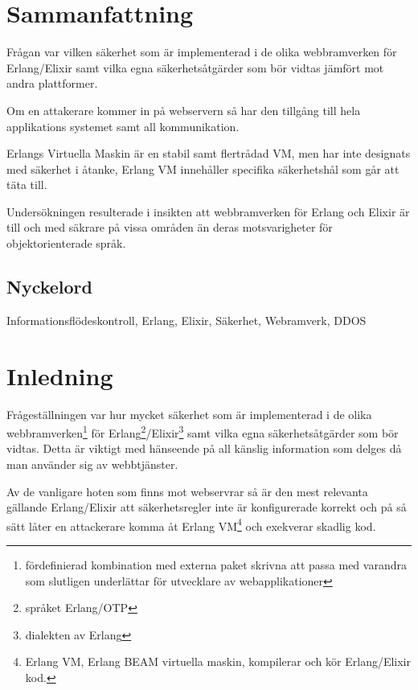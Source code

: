 \documentclass[12pt]{article}
\begin{document}
\maketitle

	 	 	 	 	
	
\section*{Sammanfattning}
Frågan var vilken säkerhet som är implementerad i de olika webbramverken för Erlang/Elixir samt vilka egna säkerhetsåtgärder som bör vidtas jämfört mot andra plattformer.

Om en attakerare kommer in på webservern så har den tillgång till hela applikations systemet samt all kommunikation.

Erlangs Virtuella Maskin är en stabil samt flertrådad VM, men har inte designats med säkerhet i åtanke, Erlang VM innehåller specifika säkerhetshål som går att täta till.

Undersökningen resulterade i insikten att webbramverken för Erlang och Elixir är till och med säkrare på vissa områden än deras motsvarigheter för objektorienterade språk.

\subsection*{Nyckelord}
Informationsflödeskontroll, Erlang, Elixir, Säkerhet, Webramverk, DDOS
	
\section{Inledning}

Frågeställningen var hur mycket säkerhet som är implementerad i de olika webbramverken\footnote{fördefinierad kombination med externa paket skrivna att passa med varandra som slutligen underlättar för utvecklare av webapplikationer} för Erlang\footnote{språket Erlang/OTP\cite{erlang}}/Elixir\footnote{dialekten av Erlang\cite{elixir}} samt vilka egna säkerhetsåtgärder som bör vidtas.
Detta är viktigt med hänseende på all känslig information som delges då man använder sig av webbtjänster.

Av de vanligare hoten som finns mot webservrar så är den mest relevanta gällande Erlang/Elixir att säkerhetsregler inte är konfigurerade korrekt och på så sätt låter en attackerare komma åt Erlang VM\footnote{Erlang VM, Erlang BEAM virtuella maskin, kompilerar och kör Erlang/Elixir kod\cite{erlang}.} och exekverar skadlig kod. 
\end{document}
